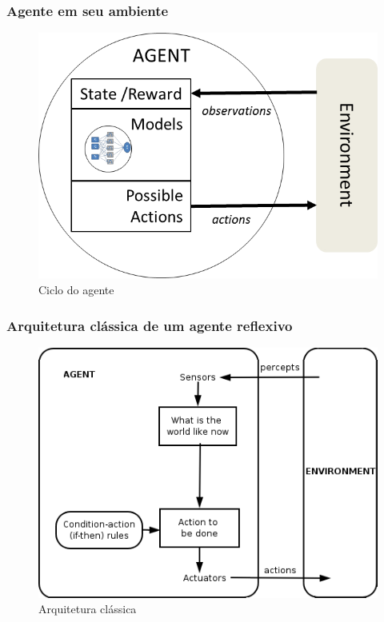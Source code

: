 \begin{frame}

  \frametitle{Agente em seu ambiente}
    
\begin{figure}[!ht]
  \centering
  \includegraphics[height =.6\textheight,width=.7\textwidth]{figuras/agente_ambiente_ciclo.png}
  \caption{Ciclo do agente}
\end{figure}
    
\end{frame}



\begin{frame}

  \frametitle{Arquitetura clássica de um agente reflexivo}
    
\begin{figure}[!ht]
\centering
\includegraphics[width=.6\textwidth]{figuras/agent-reflexivo.png}
\caption{Arquitetura clássica}
\label{ag_01}
\end{figure}
    
\end{frame}


